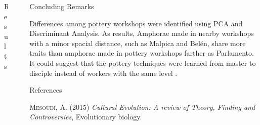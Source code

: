 \documentclass[final]{beamer}
\newlength{\sepwid}
\newlength{\onecolwid}
\newlength{\twocolwid}
\begin{document}
\begin{frame}[t]
\begin{columns}[t]
\begin{column}{\twocolwid}
\begin{block}{Results}
\begin{columns}
\begin{column}{0.48\textwidth}
 
\end{column}
\end{columns}

\end{block} 


\begin{columns}[t,totalwidth=\twocolwid] %

\begin{column}{\onecolwid} %


\end{column} %

\begin{column}{\onecolwid} %


\end{column} %

\end{columns} %

\end{column} %





\begin{column}{\sepwid}\end{column} %

\begin{column}{\onecolwid} %

\begin{block}{Concluding Remarks}

Differences among pottery workshops were identified using PCA and Discriminant Analysis. As results, Amphorae made in nearby workshops with a minor spacial distance, such as Malpica and Bel\'en, share more traits than amphorae made in pottery workshops farther as Parlamento. It could suggest that the pottery techniques were learned from master to disciple instead of workers with the same level . 

\end{block}

\begin{block}{References}
\small

\textsc{Mesoudi, A. (2015)}
\textit{Cultural Evolution: A review of Theory, Finding and Controversies}, Evolutionary biology.


\end{block}
\end{column}
\end{columns}
\end{frame}
\end{document}
